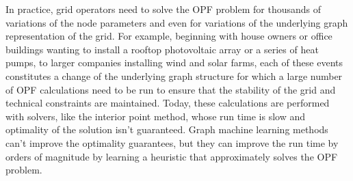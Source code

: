 In practice, grid operators need to solve the OPF problem for thousands of variations of the node parameters and even for variations of the
underlying graph representation of the grid.
For example, beginning with house owners or office buildings wanting to install a rooftop photovoltaic array or a series of heat pumps,
to larger companies installing wind and solar farms, each of these events constitutes a change of the underlying graph structure for
which a large number of OPF calculations need to be run to ensure that the stability of the grid and technical constraints are maintained.
Today, these calculations are performed with solvers, like the interior point method, whose run time is slow and optimality of
the solution isn't guaranteed\cite{cain2012history}.
Graph machine learning methods can't improve the optimality guarantees, but they can improve the run time by orders of magnitude by learning a heuristic that approximately solves the OPF problem.